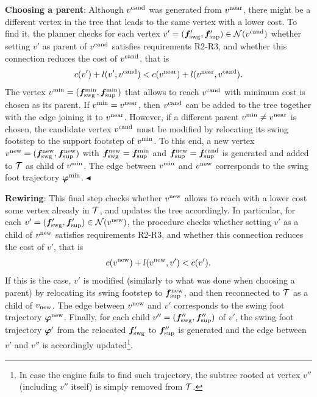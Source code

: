 {\bf Choosing a parent}: Although $v^{\rm cand}$ was generated from $v^{\rm near}$, there might be a different vertex in the tree that leads to the same vertex with a lower cost. To find it, the planner checks for each vertex $v' = ({\bm{f}}'_{\rm swg}, {\bm{f}}'_{\rm sup})\in {\cal N} (v^{\rm cand})$ whether setting $v'$ as parent of $v^{\rm cand}$ satisfies requirements R2-R3, and whether this connection reduces the cost of $v^{\rm cand}$, that is 
\[
c(v') + l(v', v^{\rm cand}) < c(v^{\rm near}) + l(v^{\rm near}, v^{\rm cand}).
\]
The vertex $v^{\rm min} = ({\bm{f}}_{\rm swg}^{\rm min}, {\bm{f}}_{\rm sup}^{\rm min})$ that allows to reach $v^{\rm cand}$ with minimum cost is chosen as its parent. If $v^{\rm min} = v^{\rm near}$, then $v^{\rm cand}$ can be added to the tree together with the edge joining it to $v^{\rm near}$. However, if a different parent $v^{\rm min} \neq v^{\rm near}$ is chosen, the candidate vertex $v^{\rm cand}$ must be modified by relocating its swing footstep to the support footstep of $v^{\rm min}$.
To this end, a new vertex $v^{\rm new} = ({\bm{f}}_{\rm swg}^{\rm new}, {\bm{f}}_{\rm sup}^{\rm new})$ with ${\bm{f}}_{\rm swg}^{\rm new} = {\bm{f}}_{\rm sup}^{\rm min}$ and ${\bm{f}}_{\rm sup}^{\rm new} = {\bm{f}}_{\rm sup}^{\rm cand}$ is generated and added to ${\cal T}$ as child of $v^{\rm min}$. The edge between $v^{\rm min}$ and $v^{\rm new}$ corresponds to the swing foot trajectory ${\bm{\varphi}}^{\rm min}$. 
\hfill $\blacktriangleleft$

{\bf Rewiring}: This final step checks whether $v^{\rm new}$ allows to reach with a lower cost some vertex already in $\cal T$, and updates the tree accordingly. In particular, for each $v' = ({\bm{f}}'_{\rm swg}, {\bm{f}}'_{\rm sup}) \in {\cal N} (v^{\rm new})$, the procedure checks whether setting $v'$ as a child of $v^{\rm new}$ satisfies requirements R2-R3, and whether this connection reduces the cost of $v'$, that is 
\[
c(v^{\rm new}) + l(v^{\rm new}, v') < c(v').
\]
If this is the case, $v'$ is modified (similarly to what was done when choosing a parent) by relocating its swing footstep to ${\bm{f}}_{\rm sup}^{\rm new}$, and then  reconnected to $\cal T$ as a child of $v_{\rm new}$. The edge between $v^{\rm new}$ and $v'$ corresponds to the swing foot trajectory ${\bm{\varphi}}^{\rm new}$.
Finally, for each child $v'' = ({\bm{f}}''_{\rm swg}, {\bm{f}}''_{\rm sup})$ of $v'$, the swing foot trajectory ${\bm{\varphi}}'$ from the relocated ${\bm{f}}'_{\rm swg}$ to ${\bm{f}}''_{\rm sup}$ is generated and the edge between $v'$ and $v''$ is accordingly updated\footnote{In case the engine fails to find such trajectory, the subtree rooted at vertex $v''$ (including $v''$ itself) is simply removed from $\cal T$.}.

